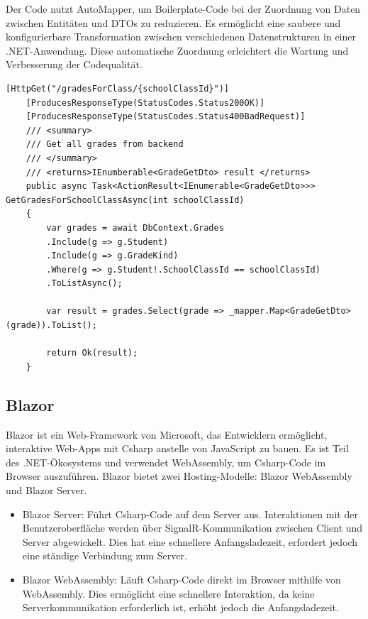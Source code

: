 Der Code nutzt AutoMapper, um Boilerplate-Code bei der Zuordnung von Daten zwischen Entitäten und DTOs zu reduzieren. 
Es ermöglicht eine saubere und konfigurierbare Transformation zwischen verschiedenen Datenstrukturen in einer .NET-Anwendung. 
Diese automatische Zuordnung erleichtert die Wartung und Verbesserung der Codequalität.

\newpage

\begin{lstlisting}[language={[Sharp]C}, caption=HttpGetMethod, label=lst:imp:httpGetMethod]
    [HttpGet("/gradesForClass/{schoolClassId}")]
    [ProducesResponseType(StatusCodes.Status200OK)]
    [ProducesResponseType(StatusCodes.Status400BadRequest)]
    /// <summary>
    /// Get all grades from backend
    /// </summary>
    /// <returns>IEnumberable<GradeGetDto> result </returns>
    public async Task<ActionResult<IEnumerable<GradeGetDto>>> GetGradesForSchoolClassAsync(int schoolClassId)
    {
        var grades = await DbContext.Grades
        .Include(g => g.Student)
        .Include(g => g.GradeKind)
        .Where(g => g.Student!.SchoolClassId == schoolClassId)
        .ToListAsync();
        
        var result = grades.Select(grade => _mapper.Map<GradeGetDto>(grade)).ToList();

        return Ok(result);
    }
\end{lstlisting}



\newpage

\subsection{Blazor}

Blazor ist ein Web-Framework von Microsoft, das Entwicklern ermöglicht, interaktive Web-Apps mit Csharp
 anstelle von JavaScript zu bauen. Es ist Teil des .NET-Ökosystems und verwendet WebAssembly, um Csharp-Code im Browser auszuführen. Blazor bietet zwei Hosting-Modelle: Blazor WebAssembly und Blazor Server.

\begin{itemize}
    \item Blazor Server: 
    Führt Csharp-Code auf dem Server aus. Interaktionen mit der Benutzeroberfläche werden über SignalR-Kommunikation zwischen Client und Server abgewickelt. Dies hat eine schnellere Anfangsladezeit, erfordert jedoch eine ständige Verbindung zum Server.
    \item Blazor WebAssembly: Läuft Csharp-Code direkt im Browser mithilfe von WebAssembly. Dies ermöglicht eine schnellere Interaktion, da keine Serverkommunikation erforderlich ist, erhöht jedoch die Anfangsladezeit.
\end{itemize}


